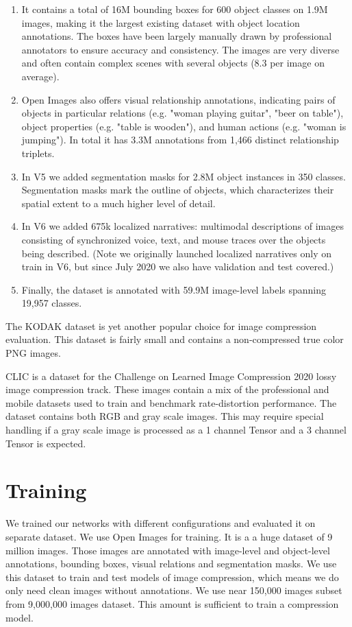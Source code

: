 \begin{enumerate}
    \item It contains a total of 16M bounding boxes for 600 object classes on 1.9M images, making it the largest existing dataset with object location annotations. The boxes have been largely manually drawn by professional annotators to ensure accuracy and consistency. The images are very diverse and often contain complex scenes with several objects (8.3 per image on average).
    \item Open Images also offers visual relationship annotations, indicating pairs of objects in particular relations (e.g. "woman playing guitar", "beer on table"), object properties (e.g. "table is wooden"), and human actions (e.g. "woman is jumping"). In total it has 3.3M annotations from 1,466 distinct relationship triplets.
    \item In V5 we added segmentation masks for 2.8M object instances in 350 classes. Segmentation masks mark the outline of objects, which characterizes their spatial extent to a much higher level of detail.
    \item In V6 we added 675k localized narratives: multimodal descriptions of images consisting of synchronized voice, text, and mouse traces over the objects being described. (Note we originally launched localized narratives only on train in V6, but since July 2020 we also have validation and test covered.)
    \item Finally, the dataset is annotated with 59.9M image-level labels spanning 19,957 classes.
\end{enumerate}

The KODAK \cite{kodak} dataset is yet another popular choice for image compression evaluation. This dataset is fairly small and contains a non-compressed true color PNG images.

CLIC \cite{noauthor_clic_nodate} is a dataset for the Challenge on Learned Image Compression 2020 lossy image compression track. These images contain a mix of the professional and mobile datasets used to train and benchmark rate-distortion performance. The dataset contains both RGB and gray scale images. This may require special handling if a gray scale image is processed as a 1 channel Tensor and a 3 channel Tensor is expected.

\section{Training}

We trained our networks with different configurations and evaluated it on separate dataset. We use Open Images \cite{OpenImages2} for training. It is a a huge dataset of 9 million images. Those images are annotated with image-level and object-level annotations, bounding boxes, visual relations and segmentation masks. We use this dataset to train and test models of image compression, which means we do only need clean images without annotations. We use near 150,000 images subset from 9,000,000 images dataset. This amount is sufficient to train a compression model.

